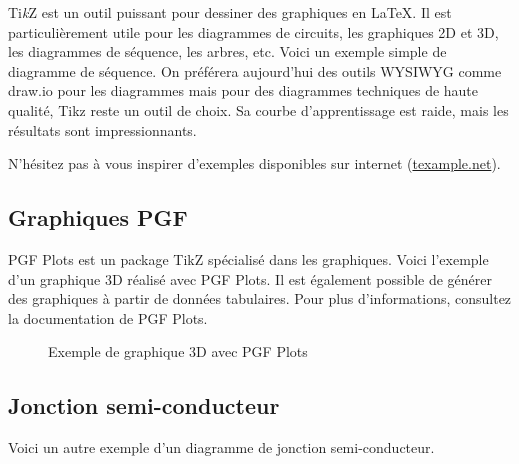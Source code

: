 Ti\textit{k}Z est un outil puissant pour dessiner des graphiques en \LaTeX. Il est particulièrement utile pour les diagrammes de circuits, les graphiques 2D et 3D, les diagrammes de séquence, les arbres, etc. Voici un exemple simple de diagramme de séquence. On préférera aujourd'hui des outils WYSIWYG comme draw.io pour les diagrammes mais pour des diagrammes techniques de haute qualité, Tikz reste un outil de choix. Sa courbe d'apprentissage est raide, mais les résultats sont impressionnants.

N'hésitez pas à vous inspirer d'exemples disponibles sur internet (\href{https://texample.net/category/science-technology/}{texample.net}).

\subsection{Graphiques PGF}

PGF Plots est un package TikZ spécialisé dans les graphiques. Voici l'exemple d'un graphique 3D réalisé avec PGF Plots. Il est également possible de générer des graphiques à partir de données tabulaires. Pour plus d'informations, consultez la documentation de PGF Plots.

\begin{figure}[H]
    \centering
    \caption{Exemple de graphique 3D avec PGF Plots}
\end{figure}

\subsection{Jonction semi-conducteur}

Voici un autre exemple d'un diagramme de jonction semi-conducteur.

